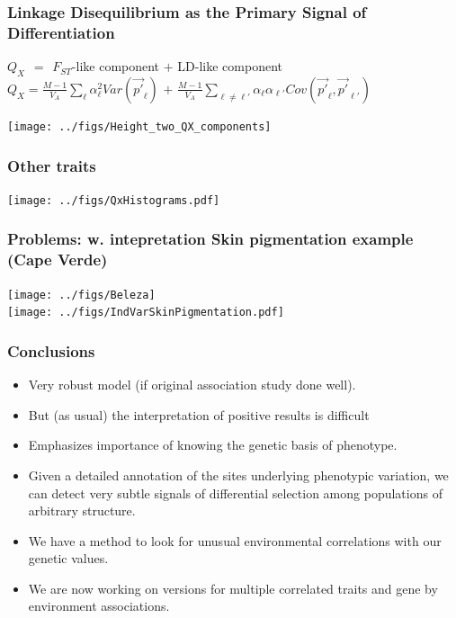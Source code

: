 \documentclass{beamer}
\begin{document}
\begin{frame}
	\frametitle{Linkage Disequilibrium as the Primary Signal of Differentiation}
		$Q_X \hspace{5pt} =\hspace{5pt} F_{ST}$-like component
                \hspace{25pt} $+$ \hspace{25pt} LD-like component\\
\vskip 0.5cm
	$Q_X = \frac{M - 1}{V_A} \sum_{\ell} \alpha_{\ell}^2
        Var(\vec{p'}_{\ell})$   \hspace{25pt}  $+$   \hspace{25pt}  $\frac{M - 1}{V_A}
	\sum_{\ell \neq \ell '} \alpha_{\ell} \alpha_{\ell'} Cov(\vec{p'}_{\ell},\vec{p'}_{\ell '})$
		\begin{center}
			\texttt{[image: ../figs/Height\_two\_QX\_components]}
		\end{center}
\end{frame}


\begin{frame}
	\frametitle{Other traits}
	\begin{center}
	\texttt{[image: ../figs/QxHistograms.pdf]}
\end{center}
\end{frame}




\begin{frame}
	\frametitle{Problems: w. intepretation Skin pigmentation example (Cape Verde)}
	\texttt{[image: ../figs/Beleza]}\\

	\texttt{[image: ../figs/IndVarSkinPigmentation.pdf]}
\end{frame}

\begin{frame}
	\frametitle{Conclusions}
	\begin{itemize}
 
\item Very robust model (if original association study done well).
		\item But (as usual) the interpretation of positive results is difficult
       \item Emphasizes importance of knowing the genetic basis
          of phenotype.
		\item Given a detailed annotation of the sites
                  underlying phenotypic variation, we can detect very
                  subtle signals of differential selection among
                  populations of arbitrary structure.
\item We have a method to look for unusual environmental correlations with our
  genetic values. 
		\item We are now working on versions for multiple
                  correlated traits and gene by environment associations.
	\end{itemize}
\end{frame}
\end{document}
